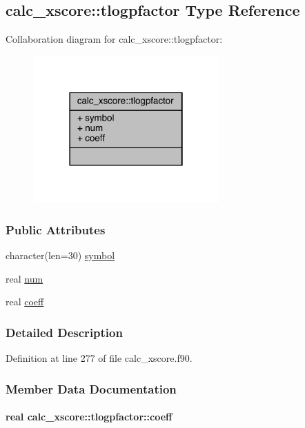 \hypertarget{structcalc__xscore_1_1tlogpfactor}{\subsection{calc\-\_\-xscore\-:\-:tlogpfactor Type Reference}
\label{structcalc__xscore_1_1tlogpfactor}
}


Collaboration diagram for calc\-\_\-xscore\-:\-:tlogpfactor\-:
\nopagebreak
\begin{figure}[H]
\begin{center}
\leavevmode
\includegraphics[width=202pt]{structcalc__xscore_1_1tlogpfactor__coll__graph}
\end{center}
\end{figure}
\subsubsection*{Public Attributes}
\begin{DoxyCompactItemize}
\item 
character(len=30) \hyperlink{structcalc__xscore_1_1tlogpfactor_a19a3c46be66380c108d9fd7191dce5bb}{symbol}
\item 
real \hyperlink{structcalc__xscore_1_1tlogpfactor_a625e8a8380e98e1c0c4ff615ec9b183b}{num}
\item 
real \hyperlink{structcalc__xscore_1_1tlogpfactor_a6eb464178ee7522d72e96e6efd3e57d8}{coeff}
\end{DoxyCompactItemize}


\subsubsection{Detailed Description}


Definition at line 277 of file calc\-\_\-xscore.\-f90.



\subsubsection{Member Data Documentation}
\hypertarget{structcalc__xscore_1_1tlogpfactor_a6eb464178ee7522d72e96e6efd3e57d8}{
\paragraph[{coeff}]{\setlength{\rightskip}{0pt plus 5cm}real calc\-\_\-xscore\-::tlogpfactor\-::coeff}}\label{structcalc__xscore_1_1tlogpfactor_a6eb464178ee7522d72e96e6efd3e57d8}


